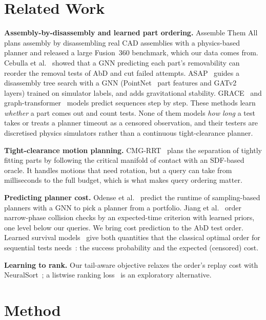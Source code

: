 \documentclass[conference]{IEEEtran}
\begin{document}
\section{Related Work}
\label{sec:related}
\textbf{Assembly-by-disassembly and learned part ordering.}
Assemble Them All~\cite{tian2022ata} plans assembly by disassembling real CAD assemblies with a physics-based
planner and released a large Fusion~360 benchmark, which our data comes from. Cebulla et al.~\cite{cebulla2023} showed
that a GNN predicting each part's removability can reorder the removal tests of AbD and cut failed attempts. ASAP~\cite{tian2024asap}
guides a disassembly tree search with a GNN (PointNet~\cite{qi2017pointnet} part features and GATv2~\cite{brody2022gatv2}
layers) trained on simulator labels, and adds gravitational stability. GRACE~\cite{atad2023} and graph-transformer~\cite{ma2022graphtransformer}
models predict sequences step by step. These methods learn \emph{whether} a part comes out and count tests. None of
them models \emph{how long} a test takes or treats a planner timeout as a censored observation, and their testers are
discretised physics simulators rather than a continuous tight-clearance planner.

\textbf{Tight-clearance motion planning.} CMG-RRT~\cite{livnat_cmgrrt} plans the separation of tightly fitting parts by
following the critical manifold of contact with an SDF-based oracle. It handles motions that need rotation, but a
query can take from milliseconds to the full budget, which is what makes query ordering matter.

\textbf{Predicting planner cost.} Odense et al.~\cite{odense2022} predict the runtime of sampling-based planners with a
GNN to pick a planner from a portfolio. Jiang et al.~\cite{jiang2026checkorder} order narrow-phase collision checks by an
expected-time criterion with learned priors, one level below our queries. We bring cost prediction to the AbD test
order. Learned survival models~\cite{gensheimer2019} give both quantities that the classical optimal order for
sequential tests needs~\cite{simon1975}: the success probability and the expected (censored) cost.

\textbf{Learning to rank.} Our tail-aware objective relaxes the order's replay cost with NeuralSort~\cite{grover2019neuralsort};
a listwise ranking loss~\cite{cao2007listnet} is an exploratory alternative.

\section{Method}
\label{sec:method}
\end{document}
